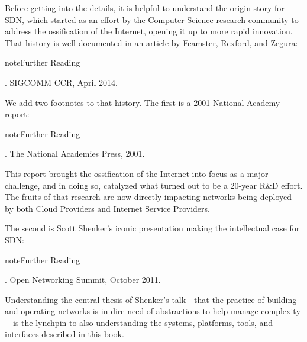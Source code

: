 \documentclass[letterpaper,11pt,english]{sphinxmanual}
\begin{document}
Before getting into the details, it is helpful to understand the
origin story for SDN, which started as an effort by the Computer
Science research community to address the ossification of the
Internet, opening it up to more rapid innovation. That history is
well-documented in an article by Feamster, Rexford, and Zegura:

\label{\detokenize{intro:reading-history}}
\begin{sphinxadmonition}{note}{Further Reading}

.
SIGCOMM CCR, April 2014.
\end{sphinxadmonition}

We add two footnotes to that history. The first is a 2001 National
Academy report:

\label{\detokenize{intro:reading-ossified}}
\begin{sphinxadmonition}{note}{Further Reading}

. The National
Academies Press, 2001.
\end{sphinxadmonition}

This report brought the ossification of the Internet into focus as a
major challenge, and in doing so, catalyzed what turned out to be a
20-year R\&D effort. The fruits of that research are now directly
impacting networks being deployed by both Cloud Providers and Internet
Service Providers.

The second is Scott Shenker’s iconic presentation making the
intellectual case for SDN:

\label{\detokenize{intro:reading-shenker}}
\begin{sphinxadmonition}{note}{Further Reading}

.
Open Networking Summit, October 2011.
\end{sphinxadmonition}

Understanding the central thesis of Shenker’s talk—that the practice
of building and operating networks is in dire need of abstractions to
help manage complexity—is the lynchpin to also understanding the
systems, platforms, tools, and interfaces described in this book.
\end{document}
